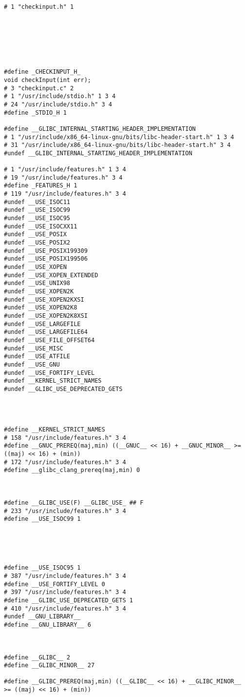 \documentclass[11pt]{article}
\begin{document}
\begin{enumerate}
\begin{verbatim}
# 1 "checkinput.h" 1







#define _CHECKINPUT_H_ 
void checkInput(int err);
# 3 "checkinput.c" 2
# 1 "/usr/include/stdio.h" 1 3 4
# 24 "/usr/include/stdio.h" 3 4
#define _STDIO_H 1

#define __GLIBC_INTERNAL_STARTING_HEADER_IMPLEMENTATION 
# 1 "/usr/include/x86_64-linux-gnu/bits/libc-header-start.h" 1 3 4
# 31 "/usr/include/x86_64-linux-gnu/bits/libc-header-start.h" 3 4
#undef __GLIBC_INTERNAL_STARTING_HEADER_IMPLEMENTATION

# 1 "/usr/include/features.h" 1 3 4
# 19 "/usr/include/features.h" 3 4
#define _FEATURES_H 1
# 119 "/usr/include/features.h" 3 4
#undef __USE_ISOC11
#undef __USE_ISOC99
#undef __USE_ISOC95
#undef __USE_ISOCXX11
#undef __USE_POSIX
#undef __USE_POSIX2
#undef __USE_POSIX199309
#undef __USE_POSIX199506
#undef __USE_XOPEN
#undef __USE_XOPEN_EXTENDED
#undef __USE_UNIX98
#undef __USE_XOPEN2K
#undef __USE_XOPEN2KXSI
#undef __USE_XOPEN2K8
#undef __USE_XOPEN2K8XSI
#undef __USE_LARGEFILE
#undef __USE_LARGEFILE64
#undef __USE_FILE_OFFSET64
#undef __USE_MISC
#undef __USE_ATFILE
#undef __USE_GNU
#undef __USE_FORTIFY_LEVEL
#undef __KERNEL_STRICT_NAMES
#undef __GLIBC_USE_DEPRECATED_GETS




#define __KERNEL_STRICT_NAMES 
# 158 "/usr/include/features.h" 3 4
#define __GNUC_PREREQ(maj,min) ((__GNUC__ << 16) + __GNUC_MINOR__ >= ((maj) << 16) + (min))
# 172 "/usr/include/features.h" 3 4
#define __glibc_clang_prereq(maj,min) 0



#define __GLIBC_USE(F) __GLIBC_USE_ ## F
# 233 "/usr/include/features.h" 3 4
#define __USE_ISOC99 1





#define __USE_ISOC95 1
# 387 "/usr/include/features.h" 3 4
#define __USE_FORTIFY_LEVEL 0
# 397 "/usr/include/features.h" 3 4
#define __GLIBC_USE_DEPRECATED_GETS 1
# 410 "/usr/include/features.h" 3 4
#undef __GNU_LIBRARY__
#define __GNU_LIBRARY__ 6



#define __GLIBC__ 2
#define __GLIBC_MINOR__ 27

#define __GLIBC_PREREQ(maj,min) ((__GLIBC__ << 16) + __GLIBC_MINOR__ >= ((maj) << 16) + (min))






\end{verbatim}
\end{enumerate}
\end{document}
